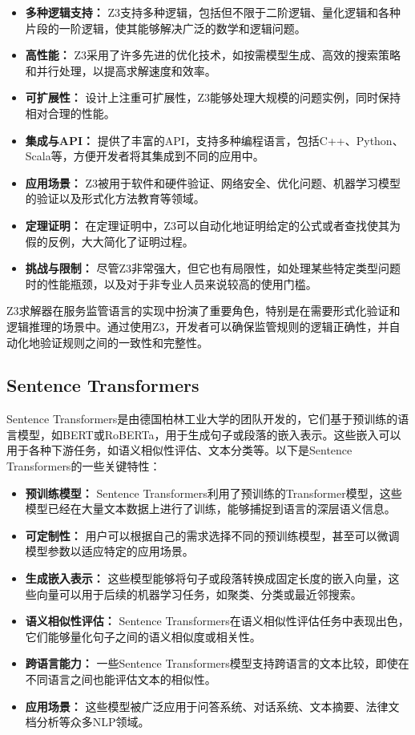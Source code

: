 \begin{itemize}
    \item \textbf{多种逻辑支持：} Z3支持多种逻辑，包括但不限于二阶逻辑、量化逻辑和各种片段的一阶逻辑，使其能够解决广泛的数学和逻辑问题。
    \item \textbf{高性能：} Z3采用了许多先进的优化技术，如按需模型生成、高效的搜索策略和并行处理，以提高求解速度和效率。
    \item \textbf{可扩展性：} 设计上注重可扩展性，Z3能够处理大规模的问题实例，同时保持相对合理的性能。
    \item \textbf{集成与API：} 提供了丰富的API，支持多种编程语言，包括C++、Python、Scala等，方便开发者将其集成到不同的应用中。
    \item \textbf{应用场景：} Z3被用于软件和硬件验证、网络安全、优化问题、机器学习模型的验证以及形式化方法教育等领域。
    \item \textbf{定理证明：} 在定理证明中，Z3可以自动化地证明给定的公式或者查找使其为假的反例，大大简化了证明过程。
    \item \textbf{挑战与限制：} 尽管Z3非常强大，但它也有局限性，如处理某些特定类型问题时的性能瓶颈，以及对于非专业人员来说较高的使用门槛。
\end{itemize}

Z3求解器在服务监管语言的实现中扮演了重要角色，特别是在需要形式化验证和逻辑推理的场景中。通过使用Z3，开发者可以确保监管规则的逻辑正确性，并自动化地验证规则之间的一致性和完整性。

\subsection{Sentence Transformers}
Sentence Transformers是由德国柏林工业大学的团队开发的，它们基于预训练的语言模型，如BERT或RoBERTa，用于生成句子或段落的嵌入表示。这些嵌入可以用于各种下游任务，如语义相似性评估、文本分类等。以下是Sentence Transformers的一些关键特性：

\begin{itemize}
    \item \textbf{预训练模型：} Sentence Transformers利用了预训练的Transformer模型，这些模型已经在大量文本数据上进行了训练，能够捕捉到语言的深层语义信息。
    \item \textbf{可定制性：} 用户可以根据自己的需求选择不同的预训练模型，甚至可以微调模型参数以适应特定的应用场景。
    \item \textbf{生成嵌入表示：} 这些模型能够将句子或段落转换成固定长度的嵌入向量，这些向量可以用于后续的机器学习任务，如聚类、分类或最近邻搜索。
    \item \textbf{语义相似性评估：} Sentence Transformers在语义相似性评估任务中表现出色，它们能够量化句子之间的语义相似度或相关性。
    \item \textbf{跨语言能力：} 一些Sentence Transformers模型支持跨语言的文本比较，即使在不同语言之间也能评估文本的相似性。
    \item \textbf{应用场景：} 这些模型被广泛应用于问答系统、对话系统、文本摘要、法律文档分析等众多NLP领域。
\end{itemize}

